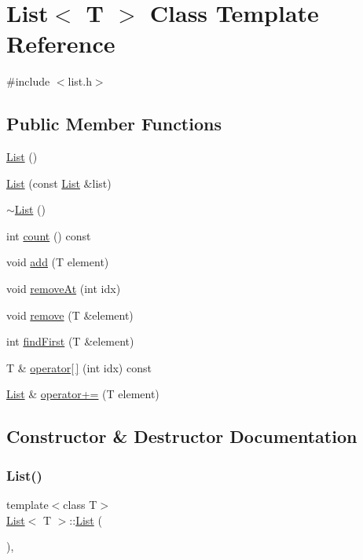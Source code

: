 \hypertarget{class_list}{}\section{List$<$ T $>$ Class Template Reference}
\label{class_list}


{\ttfamily \#include $<$list.\+h$>$}

\subsection*{Public Member Functions}
\begin{DoxyCompactItemize}
\item 
\hyperlink{class_list_a5c5e27671b21b3815d4e25b953c69454}{List} ()
\item 
\hyperlink{class_list_a296c8387f6c9c0292db7bb19f7e923ac}{List} (const \hyperlink{class_list}{List} \&list)
\item 
\hyperlink{class_list_a2b58189090f6e5ce52939c9195e59e85}{$\sim$\+List} ()
\item 
int \hyperlink{class_list_a7a74fc01260437fac92355dc8d4e789c}{count} () const
\item 
void \hyperlink{class_list_acfdf6d32029662866a5aeb2c9c44bab8}{add} (T element)
\item 
void \hyperlink{class_list_a54fa90e725d350cd7bd41270ebdfe775}{remove\+At} (int idx)
\item 
void \hyperlink{class_list_ab20b18c4facb9c8ab89640c202057b80}{remove} (T \&element)
\item 
int \hyperlink{class_list_aab90a0362da4ba513ac5460af21e1adb}{find\+First} (T \&element)
\item 
T \& \hyperlink{class_list_af9d0336374aa0025662e16f2b087819c}{operator\mbox{[}$\,$\mbox{]}} (int idx) const
\item 
\hyperlink{class_list}{List} \& \hyperlink{class_list_a81a44c4aae9bb74b5166004cd28d9ac6}{operator+=} (T element)
\end{DoxyCompactItemize}


\subsection{Constructor \& Destructor Documentation}
\mbox{\label{class_list_a5c5e27671b21b3815d4e25b953c69454}} 
\subsubsection{\texorpdfstring{List()}{List()}\hspace{0.1cm}{\footnotesize\ttfamily [1/2]}}
{\footnotesize\ttfamily template$<$class T$>$ \\
\hyperlink{class_list}{List}$<$ T $>$\+::\hyperlink{class_list}{List} (\begin{DoxyParamCaption}{ }\end{DoxyParamCaption})\hspace{0.3cm}{\ttfamily [inline]}, {\ttfamily [explicit]}}

